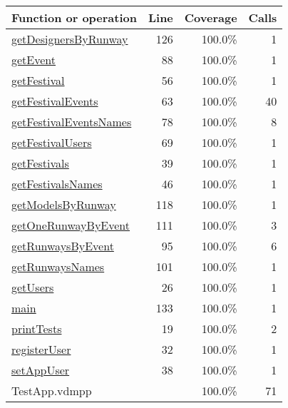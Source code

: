 \begin{longtable}{|l|r|r|r|}
\hline
Function or operation & Line & Coverage & Calls \\
\hline
\hline
\hyperref[getDesignersByRunway:126]{getDesignersByRunway} & 126&100.0\% & 1 \\
\hline
\hyperref[getEvent:88]{getEvent} & 88&100.0\% & 1 \\
\hline
\hyperref[getFestival:56]{getFestival} & 56&100.0\% & 1 \\
\hline
\hyperref[getFestivalEvents:63]{getFestivalEvents} & 63&100.0\% & 40 \\
\hline
\hyperref[getFestivalEventsNames:78]{getFestivalEventsNames} & 78&100.0\% & 8 \\
\hline
\hyperref[getFestivalUsers:69]{getFestivalUsers} & 69&100.0\% & 1 \\
\hline
\hyperref[getFestivals:39]{getFestivals} & 39&100.0\% & 1 \\
\hline
\hyperref[getFestivalsNames:46]{getFestivalsNames} & 46&100.0\% & 1 \\
\hline
\hyperref[getModelsByRunway:118]{getModelsByRunway} & 118&100.0\% & 1 \\
\hline
\hyperref[getOneRunwayByEvent:111]{getOneRunwayByEvent} & 111&100.0\% & 3 \\
\hline
\hyperref[getRunwaysByEvent:95]{getRunwaysByEvent} & 95&100.0\% & 6 \\
\hline
\hyperref[getRunwaysNames:101]{getRunwaysNames} & 101&100.0\% & 1 \\
\hline
\hyperref[getUsers:26]{getUsers} & 26&100.0\% & 1 \\
\hline
\hyperref[main:133]{main} & 133&100.0\% & 1 \\
\hline
\hyperref[printTests:19]{printTests} & 19&100.0\% & 2 \\
\hline
\hyperref[registerUser:32]{registerUser} & 32&100.0\% & 1 \\
\hline
\hyperref[setAppUser:38]{setAppUser} & 38&100.0\% & 1 \\
\hline
\hline
TestApp.vdmpp & & 100.0\% & 71 \\
\hline
\end{longtable}

